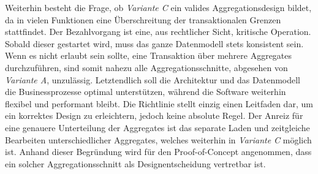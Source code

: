 Weiterhin besteht die Frage, ob \emph{Variante C} ein valides Aggregationsdesign bildet, da in vielen Funktionen eine Überschreitung der transaktionalen Grenzen stattfindet. Der Bezahlvorgang ist eine, aus rechtlicher Sicht, kritische Operation. Sobald dieser gestartet wird, muss das ganze Datenmodell stets konsistent sein. Wenn es nicht erlaubt sein sollte, eine Transaktion über mehrere Aggregates durchzuführen, sind somit nahezu alle Aggregationsschnitte, abgesehen von \emph{Variante A}, unzulässig. Letztendlich soll die Architektur und das Datenmodell die Businessprozesse optimal unterstützen, während die Software weiterhin flexibel und performant bleibt. Die Richtlinie stellt einzig einen Leitfaden dar, um ein korrektes Design zu erleichtern, jedoch keine absolute Regel. Der Anreiz für eine genauere Unterteilung der Aggregates ist das separate Laden und zeitgleiche Bearbeiten unterschiedlicher Aggregates, welches weiterhin in \emph{Variante C} möglich ist. Anhand dieser Begründung wird für den Proof-of-Concept angenommen, dass ein solcher Aggregationsschnitt als Designentscheidung vertretbar ist. 

